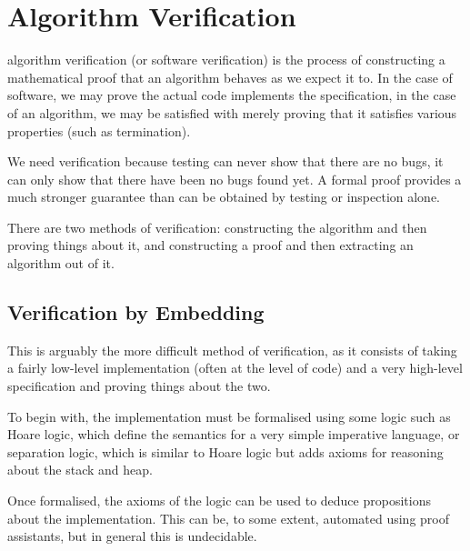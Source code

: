 \section{Algorithm Verification}
\label{sec:lit-verification}


\Gls{algorithm verification} (or software verification) is the process
of constructing a mathematical proof that an algorithm behaves as we
expect it to. In the case of software, we may prove the actual code
implements the specification, in the case of an algorithm, we may be
satisfied with merely proving that it satisfies various properties
(such as termination).

We need verification because testing can never show that there are no
bugs, it can only show that there have been no bugs found yet. A
formal proof provides a much stronger guarantee than can be obtained
by testing or inspection alone.

There are two methods of verification: constructing the algorithm and
then proving things about it, and constructing a proof and then
extracting an algorithm out of it.

\subsection{Verification by Embedding}
\label{sec:lit-verification-embedding}

This is arguably the more difficult method of verification, as it
consists of taking a fairly low-level implementation (often at the
level of code) and a very high-level specification and proving things
about the two.

To begin with, the implementation must be formalised using some logic
such as Hoare logic\cite{Hoare69}, which define the semantics for a
very simple imperative language, or separation logic\cite{Reynolds02},
which is similar to Hoare logic but adds axioms for reasoning about
the stack and heap.

Once formalised, the axioms of the logic can be used to deduce
propositions about the implementation. This can be, to some extent,
automated using \glspl{proof assistant}, but in general this is
undecidable.

